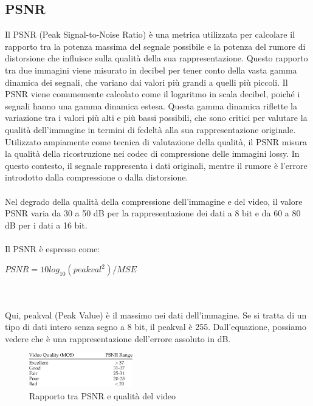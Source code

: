 \subsection{PSNR}
Il PSNR (Peak Signal-to-Noise Ratio) è una metrica utilizzata per calcolare il rapporto tra la potenza massima del segnale possibile e la potenza del rumore di distorsione che influisce sulla qualità della sua rappresentazione. Questo rapporto tra due immagini viene misurato in decibel per tener conto della vasta gamma dinamica dei segnali, che variano dai valori più grandi a quelli più piccoli.
Il PSNR viene comunemente calcolato come il logaritmo in scala decibel, poiché i segnali hanno una gamma dinamica estesa. Questa gamma dinamica riflette la variazione tra i valori più alti e più bassi possibili, che sono critici per valutare la qualità dell'immagine in termini di fedeltà alla sua rappresentazione originale.
Utilizzato ampiamente come tecnica di valutazione della qualità, il PSNR misura la qualità della ricostruzione nei codec di compressione delle immagini lossy. In questo contesto, il segnale rappresenta i dati originali, mentre il rumore è l'errore introdotto dalla compressione o dalla distorsione. 
\\
\\
Nel degrado della qualità della compressione dell'immagine e del video, il valore PSNR varia da 30 a 50 dB per la rappresentazione dei dati a 8 bit e da 60 a 80 dB per i dati a 16 bit.
\\
\\
Il PSNR è espresso come:
\\
\centerline{$PSNR = 10log_{10}(peakval^2) / MSE$}
\\
\\
Qui, peakval (Peak Value) è il massimo nei dati dell'immagine. Se si tratta di un tipo di dati intero senza segno a 8 bit, il peakval è 255. Dall'equazione, possiamo vedere che è una rappresentazione dell'errore assoluto in dB\cite{sara2019image}.

\begin{figure}[!ht]
    \centering
    \includegraphics[width=0.40\textwidth]{img/PSNR table.png}
    \caption{Rapporto tra PSNR e qualità del video}
    \label{fig:PSNR-table}
\end{figure}



